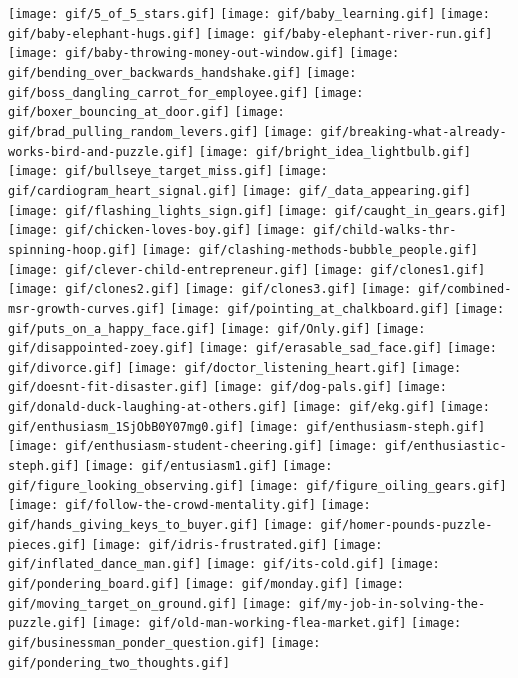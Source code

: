 \documentclass[
]{book}
\begin{document}
\texttt{[image: gif/5\_of\_5\_stars.gif]}
\texttt{[image: gif/baby\_learning.gif]}
\texttt{[image: gif/baby-elephant-hugs.gif]}
\texttt{[image: gif/baby-elephant-river-run.gif]}
\texttt{[image: gif/baby-throwing-money-out-window.gif]}
\texttt{[image: gif/bending\_over\_backwards\_handshake.gif]}
\texttt{[image: gif/boss\_dangling\_carrot\_for\_employee.gif]}
\texttt{[image: gif/boxer\_bouncing\_at\_door.gif]}
\texttt{[image: gif/brad\_pulling\_random\_levers.gif]}
\texttt{[image: gif/breaking-what-already-works-bird-and-puzzle.gif]}
\texttt{[image: gif/bright\_idea\_lightbulb.gif]}
\texttt{[image: gif/bullseye\_target\_miss.gif]}
\texttt{[image: gif/cardiogram\_heart\_signal.gif]}
\texttt{[image: gif/\_data\_appearing.gif]}
\texttt{[image: gif/flashing\_lights\_sign.gif]}
\texttt{[image: gif/caught\_in\_gears.gif]}
\texttt{[image: gif/chicken-loves-boy.gif]}
\texttt{[image: gif/child-walks-thr-spinning-hoop.gif]}
\texttt{[image: gif/clashing-methods-bubble\_people.gif]}
\texttt{[image: gif/clever-child-entrepreneur.gif]}
\texttt{[image: gif/clones1.gif]}
\texttt{[image: gif/clones2.gif]}
\texttt{[image: gif/clones3.gif]}
\texttt{[image: gif/combined-msr-growth-curves.gif]}
\texttt{[image: gif/pointing\_at\_chalkboard.gif]}
\texttt{[image: gif/puts\_on\_a\_happy\_face.gif]}
\texttt{[image: gif/Only.gif]}
\texttt{[image: gif/disappointed-zoey.gif]}
\texttt{[image: gif/erasable\_sad\_face.gif]}
\texttt{[image: gif/divorce.gif]}
\texttt{[image: gif/doctor\_listening\_heart.gif]}
\texttt{[image: gif/doesnt-fit-disaster.gif]}
\texttt{[image: gif/dog-pals.gif]}
\texttt{[image: gif/donald-duck-laughing-at-others.gif]}
\texttt{[image: gif/ekg.gif]}
\texttt{[image: gif/enthusiasm\_1SjObB0Y07mg0.gif]}
\texttt{[image: gif/enthusiasm-steph.gif]}
\texttt{[image: gif/enthusiasm-student-cheering.gif]}
\texttt{[image: gif/enthusiastic-steph.gif]}
\texttt{[image: gif/entusiasm1.gif]}
\texttt{[image: gif/figure\_looking\_observing.gif]}
\texttt{[image: gif/figure\_oiling\_gears.gif]}
\texttt{[image: gif/follow-the-crowd-mentality.gif]}
\texttt{[image: gif/hands\_giving\_keys\_to\_buyer.gif]}
\texttt{[image: gif/homer-pounds-puzzle-pieces.gif]}
\texttt{[image: gif/idris-frustrated.gif]}
\texttt{[image: gif/inflated\_dance\_man.gif]}
\texttt{[image: gif/its-cold.gif]}
\texttt{[image: gif/pondering\_board.gif]}
\texttt{[image: gif/monday.gif]}
\texttt{[image: gif/moving\_target\_on\_ground.gif]}
\texttt{[image: gif/my-job-in-solving-the-puzzle.gif]}
\texttt{[image: gif/old-man-working-flea-market.gif]}
\texttt{[image: gif/businessman\_ponder\_question.gif]}
\texttt{[image: gif/pondering\_two\_thoughts.gif]}
\end{document}
